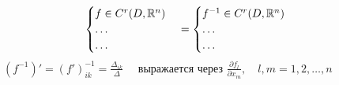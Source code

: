     \begin{remark}
        \[
            \begin{cases}
                f \in C^r(D, \mathbb{R}^n) \\
                \dots \\
                \dots
            \end{cases} = \begin{cases}
                f^{-1} \in C^r(D, \mathbb{R}^n) \\
                \dots \\
                \dots
            \end{cases}
        \]
        $\quad (f^{-1})' = (f')_{ik}^{-1} = \frac{\Delta_{ik}}{\Delta} \quad$ выражается через $\frac{\partial f_l}{\partial x_m}, \quad l, m = 1, 2, \dots, n$
    \end{remark}

